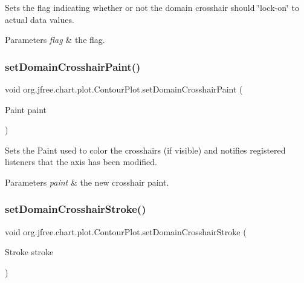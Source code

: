Sets the flag indicating whether or not the domain crosshair should \char`\"{}lock-\/on\char`\"{} to actual data values.


\begin{DoxyParams}{Parameters}
{\em flag} & the flag. \\
\hline
\end{DoxyParams}
\mbox{\label{classorg_1_1jfree_1_1chart_1_1plot_1_1_contour_plot_a383b46fd37a691fb0b5ff7e961fbf0d4}} 
\subsubsection{\texorpdfstring{set\+Domain\+Crosshair\+Paint()}{setDomainCrosshairPaint()}}
{\footnotesize\ttfamily void org.\+jfree.\+chart.\+plot.\+Contour\+Plot.\+set\+Domain\+Crosshair\+Paint (\begin{DoxyParamCaption}\item[{Paint}]{paint }\end{DoxyParamCaption})}

Sets the Paint used to color the crosshairs (if visible) and notifies registered listeners that the axis has been modified.


\begin{DoxyParams}{Parameters}
{\em paint} & the new crosshair paint. \\
\hline
\end{DoxyParams}
\mbox{\label{classorg_1_1jfree_1_1chart_1_1plot_1_1_contour_plot_ac96b87c25318fab5114d7248cc055a0a}} 
\subsubsection{\texorpdfstring{set\+Domain\+Crosshair\+Stroke()}{setDomainCrosshairStroke()}}
{\footnotesize\ttfamily void org.\+jfree.\+chart.\+plot.\+Contour\+Plot.\+set\+Domain\+Crosshair\+Stroke (\begin{DoxyParamCaption}\item[{Stroke}]{stroke }\end{DoxyParamCaption})}

